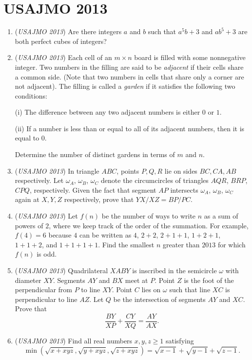 \section{USAJMO 2013}
        \begin{enumerate}
        	\item (\textit{USAJMO 2013}) Are there integers $a$ and $b$ such that $a^5b+3$ and $ab^5+3$ are both perfect cubes of integers?


 

	\item (\textit{USAJMO 2013}) Each cell of an $m\times n$ board is filled with some nonnegative integer.  Two numbers in the filling are said to be \textit{adjacent} if their cells share a common side.  (Note that two numbers in cells that share only a corner are not adjacent).  The filling is called a \textit{garden} if it satisfies the following two conditions:


 (i) The difference between any two adjacent numbers is either $0$ or $1$.


 (ii) If a number is less than or equal to all of its adjacent numbers, then it is equal to $0$.


 Determine the number of distinct gardens in terms of $m$ and $n$.


 

	\item (\textit{USAJMO 2013}) In triangle $ABC$, points $P,Q,R$ lie on sides $BC,CA,AB$ respectively.  Let $\omega_A$, $\omega_B$, $\omega_C$ denote the circumcircles of triangles $AQR$, $BRP$, $CPQ$, respectively.  Given the fact that segment $AP$ intersects $\omega_A$, $\omega_B$, $\omega_C$ again at $X,Y,Z$ respectively, prove that $YX/XZ=BP/PC$.


 

	\item (\textit{USAJMO 2013}) Let $f(n)$ be the number of ways to write $n$ as a sum of powers of $2$, where we keep track of the order of the summation.  For example, $f(4)=6$ because $4$ can be written as $4$, $2+2$, $2+1+1$, $1+2+1$, $1+1+2$, and $1+1+1+1$.  Find the smallest $n$ greater than $2013$ for which $f(n)$ is odd.


 

	\item (\textit{USAJMO 2013}) Quadrilateral $XABY$ is inscribed in the semicircle $\omega$ with diameter $XY$.  Segments $AY$ and $BX$ meet at $P$.  Point $Z$ is the foot of the perpendicular from $P$ to line $XY$.  Point $C$ lies on $\omega$ such that line $XC$ is perpendicular to line $AZ$.  Let $Q$ be the intersection of segments $AY$ and $XC$.  Prove that 
 \[\dfrac{BY}{XP}+\dfrac{CY}{XQ}=\dfrac{AY}{AX}.\]


	\item (\textit{USAJMO 2013}) Find all real numbers $x,y,z\geq 1$ satisfying 
 \[\min(\sqrt{x+xyz},\sqrt{y+xyz},\sqrt{z+xyz})=\sqrt{x-1}+\sqrt{y-1}+\sqrt{z-1}.\]


\end{enumerate}